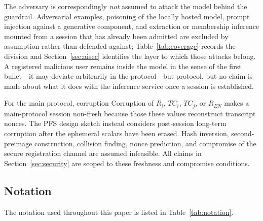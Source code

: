 \documentclass[cmc,article,submit,moreauthors,pdftex]{Definitions/tsp}
\providecommand{\DIFadd}[1]{{\protect\color{blue} \sf #1}} %
\providecommand{\DIFdel}[1]{{\protect\color{red} \scriptsize #1}} %
\providecommand{\DIFaddbegin}{} %
\providecommand{\DIFaddend}{} %
\providecommand{\DIFdelbegin}{} %
\providecommand{\DIFdelend}{} %
\begin{document}
The adversary is correspondingly \emph{not} assumed to attack the model behind the guardrail. Adversarial examples, poisoning of the locally hosted model, prompt injection against a generative component, and extraction or membership inference mounted from a session that has already been admitted are excluded by assumption rather than defended against; Table~\ref{tab:coverage} records the division and Section~\ref{sec:aisec} identifies the layer to which those attacks belong. A registered malicious user \DIFdelbegin \DIFdel{remains inside the model in the sense of the first bullet---it }\DIFdelend may deviate arbitrarily in the \DIFdelbegin \DIFdel{protocol---but }\DIFdelend \DIFaddbegin \DIFadd{protocol, but }\DIFaddend no claim is made about what it does with the inference service once a session is established.

\DIFdelbegin \DIFdel{For the main protocol, corruption }\DIFdelend \DIFaddbegin \DIFadd{Corruption }\DIFaddend of $R_i$, $TC_i$, $TC_j$, or $R_{EN}$ makes a \DIFaddbegin \DIFadd{main-protocol }\DIFaddend session non-fresh because \DIFdelbegin \DIFdel{those }\DIFdelend \DIFaddbegin \DIFadd{these }\DIFaddend values reconstruct transcript nonces. \DIFdelbegin \DIFdel{The PFS design sketch instead considers post-session long-term corruption after the ephemeral scalars have been erased. }\DIFdelend Hash inversion, second-preimage construction, collision finding, nonce prediction, and compromise of the secure registration channel are assumed infeasible. All claims in Section~\ref{sec:security} are scoped to these freshness and compromise conditions.

\subsection{Notation}

The notation used throughout this paper is listed in Table~\ref{tab:notation}.
\end{document}
